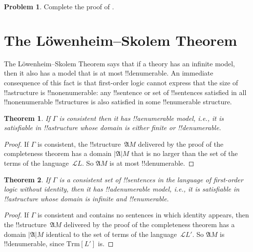 \documentclass[10pt,a4paper]{article}
\makeatletter
\theoremstyle{plain}
\newtheorem{thm}{Theorem}[section]
\theoremstyle{definition}
\newtheorem{prob}{Problem}[section]
\theoremstyle{remark}
\newcommand*{\olfileid}[3]{}
\newcommand*{\olsection}[1]{\section*{#1}}
\newcommand*{\ollabel}[1]{\label{#1}}
\newcommand{\olref}{\@ifnextchar[{\olref@i}{\olref@final}}
\def\olref@i[#1]{\@ifnextchar[{\olref@ii}{\olref@final}}
\def\olref@ii[#1]{\@ifnextchar[{\olref@iii}{\olref@final}}
\def\olref@iii[#1]{\olref@final}
\def\olref@final#1{\ref{#1}}
\providecommand{\Struct}{\ensuremath{\mathfrak{A}}}
\providecommand{\Domain}{\ensuremath{|\mathfrak{A}|}}
\providecommand{\Lang}{\ensuremath{\mathcal{L}}}
\providecommand{\Trm}{\mathrm{Trm}}
\makeatother
\begin{document}

\begin{prob}
Complete the proof of \olref[pl][com][mod]{lem:truth}.
\end{prob}

\tagendprob





\olfileid{fol}{com}{dls}
\olsection{The L\"owenheim--Skolem Theorem}

The L\"owenheim--Skolem Theorem says that if a theory has an infinite
model, then it also has a model that is at most !!{denumerable}. An
immediate consequence of this fact is that first-order logic cannot
express that the size of !!a{structure} is !!{nonenumerable}: any
!!{sentence} or set of !!{sentence}s satisfied in all
!!{nonenumerable} !!{structure}s is also satisfied in some
!!{enumerable} structure.

\begin{thm} 
\ollabel{thm:downward-ls} If $\Gamma$ is consistent then it has
!!a{enumerable} model, i.e., it is satisfiable in !!a{structure}
whose domain is either finite or !!{denumerable}.
\end{thm}

\begin{proof}
If $\Gamma$ is consistent, the !!{structure}~$\Struct M$ delivered by
the proof of the completeness theorem has a domain $\Domain{M}$ that
is no larger than the set of the terms of the language~$\Lang L$. So
$\Struct M$ is at most !!{denumerable}.
\end{proof}

\begin{thm}
\ollabel{noidentity-ls} If $\Gamma$ is a consistent set of !!{sentence}s
in the language of first-order logic without identity, then it has
!!a{denumerable} model, i.e., it is satisfiable in !!a{structure}
whose domain is infinite and !!{enumerable}.
\end{thm}

\begin{proof}
If $\Gamma$ is consistent and contains no sentences in which identity
appears, then the !!{structure}~$\Struct M$ delivered by the proof of
the completeness theorem has a domain $\Domain{M}$ identical to the set
of terms of the language~$\Lang L'$. So $\Struct{M}$ is
!!{denumerable}, since $\Trm[L']$ is.
\end{proof}
\end{document}
